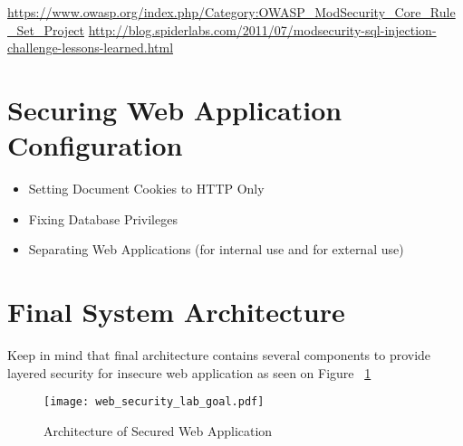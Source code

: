 \url{https://www.owasp.org/index.php/Category:OWASP_ModSecurity_Core_Rule_Set_Project}
\url{http://blog.spiderlabs.com/2011/07/modsecurity-sql-injection-challenge-lessons-learned.html}




\section{Securing Web Application Configuration}
\begin{itemize}
\item Setting Document Cookies to HTTP Only
\item Fixing Database Privileges
\item Separating Web Applications (for internal use and for external use)
\end{itemize}

\section{Final System Architecture} 
Keep in mind that final architecture contains several components to provide layered security for insecure web application as seen on Figure ~\ref{Architecture of Secured Web Application}

\begin{figure}[H] 
 \centering 
 \texttt{[image: web\_security\_lab\_goal.pdf]} 
 \caption{Architecture of Secured Web Application} 
 \label{Architecture of Secured Web Application} 
\end{figure}


